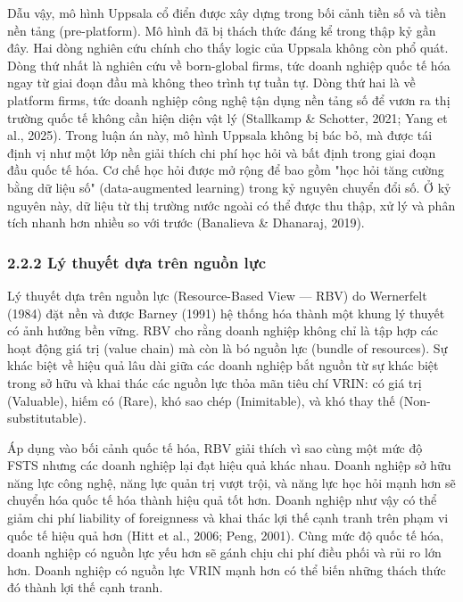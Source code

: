 \documentclass[12pt,a4paper]{article}
\begin{document}
Dẫu vậy, mô hình Uppsala cổ điển được xây dựng trong bối cảnh tiền số và
tiền nền tảng (pre-platform). Mô hình đã bị thách thức đáng kể trong
thập kỷ gần đây. Hai dòng nghiên cứu chính cho thấy logic của Uppsala
không còn phổ quát. Dòng thứ nhất là nghiên cứu về born-global firms,
tức doanh nghiệp quốc tế hóa ngay từ giai đoạn đầu mà không theo trình
tự tuần tự. Dòng thứ hai là về platform firms, tức doanh nghiệp công
nghệ tận dụng nền tảng số để vươn ra thị trường quốc tế không cần hiện
diện vật lý (Stallkamp \& Schotter, 2021; Yang et al., 2025). Trong luận
án này, mô hình Uppsala không bị bác bỏ, mà được tái định vị như một lớp
nền giải thích chi phí học hỏi và bất định trong giai đoạn đầu quốc tế
hóa. Cơ chế học hỏi được mở rộng để bao gồm "học hỏi tăng cường bằng dữ
liệu số" (data-augmented learning) trong kỷ nguyên chuyển đổi số. Ở kỷ
nguyên này, dữ liệu từ thị trường nước ngoài có thể được thu thập, xử lý
và phân tích nhanh hơn nhiều so với trước (Banalieva \& Dhanaraj, 2019).

\hypertarget{222-luxfd-thuyux1ebft-dux1ef1a-truxean-nguux1ed3n-lux1ef1c}{%
\subsubsection{2.2.2 Lý thuyết dựa trên nguồn
lực}\label{222-luxfd-thuyux1ebft-dux1ef1a-truxean-nguux1ed3n-lux1ef1c}}

Lý thuyết dựa trên nguồn lực (Resource-Based View --- RBV) do Wernerfelt
(1984) đặt nền và được Barney (1991) hệ thống hóa thành một khung lý
thuyết có ảnh hưởng bền vững. RBV cho rằng doanh nghiệp không chỉ là tập
hợp các hoạt động giá trị (value chain) mà còn là bó nguồn lực (bundle
of resources). Sự khác biệt về hiệu quả lâu dài giữa các doanh nghiệp
bắt nguồn từ sự khác biệt trong sở hữu và khai thác các nguồn lực thỏa
mãn tiêu chí VRIN: có giá trị (Valuable), hiếm có (Rare), khó sao chép
(Inimitable), và khó thay thế (Non-substitutable).

Áp dụng vào bối cảnh quốc tế hóa, RBV giải thích vì sao cùng một mức độ
FSTS nhưng các doanh nghiệp lại đạt hiệu quả khác nhau. Doanh nghiệp sở
hữu năng lực công nghệ, năng lực quản trị vượt trội, và năng lực học hỏi
mạnh hơn sẽ chuyển hóa quốc tế hóa thành hiệu quả tốt hơn. Doanh nghiệp
như vậy có thể giảm chi phí liability of foreignness và khai thác lợi
thế cạnh tranh trên phạm vi quốc tế hiệu quả hơn (Hitt et al., 2006;
Peng, 2001). Cùng mức độ quốc tế hóa, doanh nghiệp có nguồn lực yếu hơn
sẽ gánh chịu chi phí điều phối và rủi ro lớn hơn. Doanh nghiệp có nguồn
lực VRIN mạnh hơn có thể biến những thách thức đó thành lợi thế cạnh
tranh.
\end{document}
